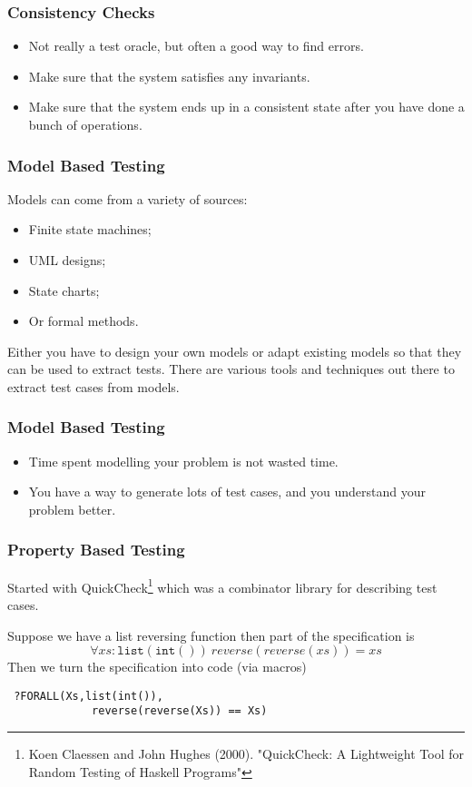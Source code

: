 \documentclass{beamer}
\begin{document}
\begin{frame}
  \frametitle{Consistency Checks}

  \begin{itemize}
  \item Not really a test oracle, but often a good way to find errors.
  \item Make sure that the system satisfies any invariants.
  \item Make sure that the system ends up in a consistent state after you have
    done a bunch of operations.
  \end{itemize}
\end{frame}
\begin{frame}
  \frametitle{Model Based Testing}

  Models can come from a variety of sources:
  \begin{itemize}
  \item Finite state machines;
  \item UML designs;
  \item State charts;
  \item Or formal methods.
  \end{itemize}
  Either you have to design your own models or adapt existing models so that
  they can be used to extract tests. There are various tools and techniques
  out there to extract test cases from models.
  
\end{frame}
\begin{frame}
  \frametitle{Model Based Testing}
  \begin{itemize}
  \item Time spent modelling your problem is not wasted time.
  \item You have a way to generate lots of test cases, and you
    understand your problem better.
  \end{itemize}
\end{frame}
\begin{frame}[fragile]
  \frametitle{Property Based Testing}
Started with QuickCheck\footnote{Koen Claessen and John Hughes
  (2000). "QuickCheck: A Lightweight Tool for Random Testing of Haskell
  Programs"} which was a combinator library for describing test cases.


Suppose we have a list reversing function then part of the  specification is
\[
  \forall xs:\mathtt{list(int())\ } reverse(reverse(xs))=xs
\]
Then we turn the specification into code (via macros)
\begin{verbatim}
 ?FORALL(Xs,list(int()),
             reverse(reverse(Xs)) == Xs)
\end{verbatim}

\end{frame}
\end{document}
